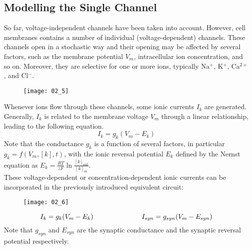 \subsection{Modelling the Single Channel}
So far, voltage-independent channels have been taken into account. However, cell membranes
contains a number of individual (voltage-dependent) channels. These channels open in a stochastic
way and their opening may be affected by several factors, such as the membrane potential \(V_{m}\),
intracellular ion concentration, and so on. Moreover, they are selective for one or more ions,
typically Na\({}^{+}\), K\({}^{+}\), Ca\({}^{2+}\), and Cl\({}^{-}\).
\begin{figure}[H]
    \texttt{[image: 02\_5]}
    \centering
\end{figure}
Whenever ions flow through these channels, some ionic currents \(I_{k}\) are generated. Generally,
\(I_{k}\) is related to the membrane voltage \(V_{m}\) through a linear relationship, leading
to the following equation.
\begin{equation*}
    I_{k}=g_{k}(V_{m}-E_{k})
\end{equation*}
Note that the conductance \(g_{k}\) is a function of several factors, in particular
\(g_{k}=f(V_{m},[k],t)\), with the ionic reversal potential \(E_{k}\) defined by the Nernst
equation as \(E_{k}=\frac{RT}{zF}\ln{\frac{[k]_{out}}{[k]_{in}}}\).\\
These voltage-dependent or concentration-dependent ionic currents can be incorporated in the
previously introduced equivalent circuit:
\begin{figure}[H]
    \texttt{[image: 02\_6]}
    \centering
\end{figure}
\begin{equation*}
    I_{k}=g_{k}(V_{m}-E_{k})
    \hspace{2.5cm}
    I_{syn}=g_{syn}(V_{m}-E_{syn})
\end{equation*}
Note that \(g_{syn}\) and \(E_{syn}\) are the synaptic conductance and the synaptic reversal
potential respectively.
